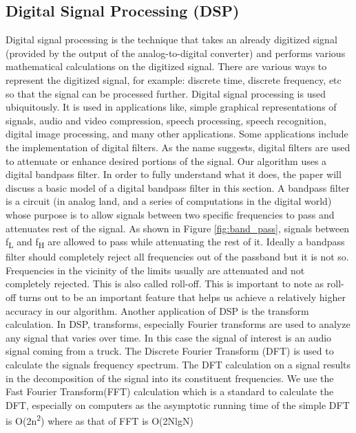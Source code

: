 \documentclass[sigconf, authorversion=false,  screen=true]{acmart}
\begin{document}
	\subsection{Digital Signal Processing (DSP)}
	Digital signal processing is the technique that takes an already digitized signal (provided by the output of the analog-to-digital converter) and performs various mathematical calculations on the digitized signal. There are various ways to represent the digitized signal, for example: discrete time, discrete frequency, etc so that the signal can be processed further.
	Digital signal processing is used ubiquitously. It is used in applications like, simple graphical representations of signals, audio and video compression, speech processing, speech recognition, digital image processing, and many other applications. Some applications include the implementation of digital filters. As the name suggests, digital filters are used to attenuate or enhance desired portions of the signal.
	Our algorithm uses a digital bandpass filter. In order to fully understand what it does, the paper will discuss a basic model of a digital bandpass filter in this section. A bandpass filter is a circuit (in analog land, and a series of computations in the digital world) whose purpose is to allow signals between two specific frequencies to pass and attenuates rest of the signal. As shown in Figure \ref{fig:band_pass}, signals between f\textsubscript{L} and f\textsubscript{H} are allowed to pass while attenuating the rest of it. Ideally a bandpass filter should completely reject all frequencies out of the passband but it is not so. Frequencies in the vicinity of the limits usually are attenuated and not completely rejected. This is also called roll-off. This is important to note as roll-off turns out to be an important feature that helps us achieve a relatively higher accuracy in our algorithm.
	Another application of DSP is the transform calculation. In DSP, transforms, especially Fourier transforms are used to analyze any signal that varies over time. In this case the signal of interest is an audio signal coming from a truck. The Discrete Fourier Transform (DFT) is used to calculate the signals frequency spectrum. The DFT calculation on a signal results in the decomposition of the signal into its constituent frequencies. We use the Fast Fourier Transform(FFT) calculation which is a standard to calculate the DFT, especially on computers as the asymptotic running time of the simple DFT is O(2n\textsuperscript{2}) where as that of FFT is O(2NlgN)
	
\end{document}
